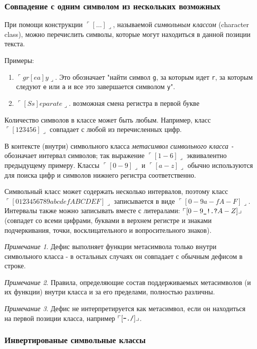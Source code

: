 \subsubsection{Совпадение с одним символом из нескольких возможных}

При помощи конструкции $\ulcorner[\ldots]\lrcorner$, называемой \emph{символьным классом} (character class), можно перечислить символы, которые могут находиться в данной позиции текста. 

Примеры:\label{examplegray}
\begin{enumerate}
\item $\ulcorner gr[ea]y\lrcorner$. Это обозначает "найти символ \verb+g+, за которым идет \verb+r+, за которым следуют \verb+e+ или \verb+a+ и все это завершается символом \verb+y+".
\item $\ulcorner[Ss]eparate\lrcorner$. возможная смена регистра в первой букве
\end{enumerate}

Количество символов в классе может быть любым. Например, класс $\ulcorner[123456]\lrcorner$ совпадает с любой из перечисленных цифр.

В контексте (внутри) символьного класса \emph{метасимвол символьного класса} \verb+-+ обозначает интервал символов; так выражение $\ulcorner[1-6]\lrcorner$ эквивалентно предыдущему примеру. Классы $\ulcorner[0-9]\lrcorner$ и $\ulcorner[a-z]\lrcorner$ обычно используются для поиска цифр и символов нижнего регистра соответственно.

Символьный класс может содержать несколько интервалов, поэтому класс $\ulcorner[0123456789abcdefABCDEF]\lrcorner$ записывается в виде $\ulcorner[0-9a-fA-F]\lrcorner$. Интервалы также можно записывать вместе с литералами: $\ulcorner[0-9\verb+_!.?+A-Z]\lrcorner$ (совпадет со всеми цифрами, буквами в верхнем регистре и знаками подчеркивания, точки, восклицательного и вопросительного знаков).

\emph{Примечание 1}. Дефис выполняет функции метасимвола только внутри символьного класса - в остальных случаях он совпадает с обычным дефисом в строке.

\emph{Примечание 2}. Правила, определяющие состав поддерживаемых метасимволов (и их функции) внутри класса и за его пределами, полностью различны.

\emph{Примечание 3}. Дефис не интерпретируется как метасимвол, если он находиться на первой позиции класса, например $\ulcorner [\verb+-./+] \lrcorner$.

\subsubsection{Инвертированые символьные классы}

